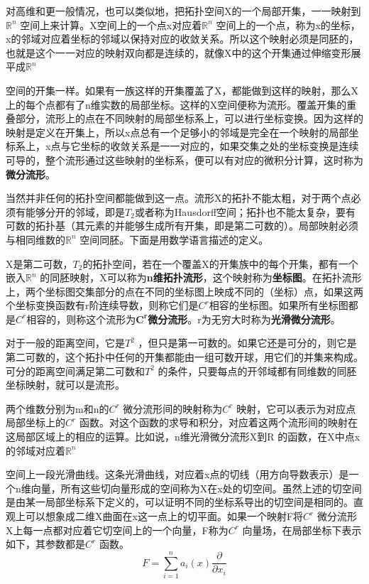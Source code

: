 对高维和更一般情况，也可以类似地，把拓扑空间X的一个局部开集，一一映射到$ \mathbb{R}^n $ 
空间上来计算。X空间上的一个点x对应着$ \mathbb{R}^n $ 空间上的一个点，称为x的坐标，x的邻域对应着坐标的邻域以保持对应的收敛关系。所以这个映射必须是同胚的，也就是这个一一对应的映射双向都是连续的，就像X中的这个开集通过伸缩变形展平成$ \mathbb{R}^n $ 

空间的开集一样。如果有一族这样的开集覆盖了X，都能做到这样的映射，那么X上的每个点都有了n维实数的局部坐标。这样的X空间便称为流形。覆盖开集的重叠部分，流形上的点在不同映射的局部坐标系上，可以进行坐标变换。因为这样的映射是定义在开集上，所以x点总有一个足够小的邻域是完全在一个映射的局部坐标系上，x点与它坐标的收敛关系是一一对应的，如果交集之处的坐标变换是连续可导的，整个流形通过这些映射的坐标系，便可以有对应的微积分计算，这时称为\textbf{微分流形}。

当然并非任何的拓扑空间都能做到这一点。流形X的拓扑不能太粗，对于两个点必须有能够分开的邻域，即是$ T_2 $或者称为Hausdorff空间；拓扑也不能太复杂，要有可数的拓扑基（其元素的并能够生成所有开集，即是第二可数的）。局部映射必须与相同维数的$ \mathbb{R}^n $  空间同胚。下面是用数学语言描述的定义。

\kaishu\setlength{\leftskip}{1em}

X是第二可数，$ T_2 $的拓扑空间，若在一个覆盖X的开集族中的每个开集，都有一个嵌入$ \mathbb{R}^n $ 的同胚映射，X可以称为\textbf{n维拓扑流形}，这个映射称为\textbf{坐标图}。在拓扑流形上，两个坐标图交集部分的点在不同的坐标图上映成不同的（坐标）点，如果这两个坐标变换函数有r阶连续导数，则称它们是$ C^r $相容的坐标图。如果所有坐标图都是$ C^r $相容的，则称这个流形为$ \mathbf{C^r} $\textbf{微分流形}。r为无穷大时称为\textbf{光滑微分流形}。

\songti\setlength{\leftskip}{0em}

对于一般的距离空间，它是$ T^2 $ ，但只是第一可数的。如果它还是可分的，则它是第二可数的，这个拓扑中任何的开集都能由一组可数开球，用它们的并集来构成。可分的距离空间满足第二可数和$ T^2 $ 的条件，只要每点的开邻域都有同维数的同胚坐标映射，就可以是流形。

两个维数分别为m和n的$ C^r $ 微分流形间的映射称为$ C^r $ 映射，它可以表示为对应点局部坐标上的$ C^r $ 函数。对这个函数的求导和积分，对应着这两个流形间的映射在这局部区域上的相应的运算。比如说，n维光滑微分流形X到R
的函数，在X中点x的邻域对应着$ \mathbb{R}^n $ 

空间上一段光滑曲线。这条光滑曲线，对应着x点的切线（用方向导数表示）是一个n维向量，所有这些切向量形成的空间称为X在x处的切空间。虽然上述的切空间是由某一局部坐标系下定义的，可以证明不同的坐标系导出的切空间是相同的。直观上可以想象成二维X曲面在x这一点上的切平面。如果一个映射F将$ C^r $ 微分流形X上每一点都对应着它切空间上的一个向量，F称为$ C^r $ 向量场，在局部坐标下表示如下，其参数都是$ C^r $ 函数。
\begin{equation}
	F = \sum _{i=1}^n a_i(x)\frac{\partial }{\partial x_i}
\end{equation}

